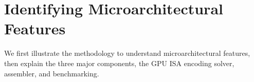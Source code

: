 \section{Identifying Microarchitectural Features}
\label{sec:assembler}

We first illustrate the methodology to understand microarchitectural features, then explain the three major components, the GPU ISA encoding solver, assembler, and benchmarking.




